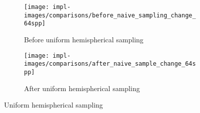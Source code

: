 \vspace{0.3em}
\begin{figure}[htb]
  \centering
  \begin{subfigure}[htb]{\textwidth}
    \texttt{[image: impl-images/comparisons/before\_naive\_sampling\_change\_64spp]}
    \caption{Before uniform hemispherical sampling}
\label{fig:rayterm-gpu_hemispherical_sampling_before_large}
  \end{subfigure}
  \begin{subfigure}[htb]{\textwidth}
    \texttt{[image: impl-images/comparisons/after\_naive\_sample\_change\_64spp]}
    \caption{After uniform hemispherical sampling}
\label{fig:rayterm-gpu_hemispherical_sampling_after_large}
  \end{subfigure}
  \caption{Uniform hemispherical sampling}
\label{fig:rayterm-gpu_hemispherical_sampling_large}
\end{figure}

